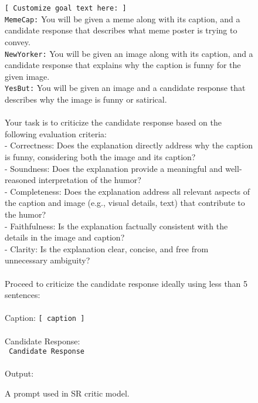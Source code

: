 \begin{figure*}
\small
\begin{tcolorbox}[
    title=Prompt for Self-Refine Critic,
    colback=white,
    colframe=Black,
    arc=0pt,        %
    outer arc=0pt,  %
]
\texttt{[ Customize goal text here: ]} \\
\texttt{MemeCap:} You will be given a meme along with its caption, and a candidate response that describes what meme poster is trying to convey. \\
\texttt{NewYorker:} You will be given an image along with its caption, and a candidate response that explains why the caption is funny for the given image. \\
\texttt{YesBut:} You will be given an image and a candidate response that describes why the image is funny or satirical. \\
\\
Your task is to criticize the candidate response based on the following evaluation criteria: \\
- Correctness: Does the explanation directly address why the caption is funny, considering both the image and its caption? \\
- Soundness: Does the explanation provide a meaningful and well-reasoned interpretation of the humor? \\
- Completeness: Does the explanation address all relevant aspects of the caption and image (e.g., visual details, text) that contribute to the humor? \\
- Faithfulness: Is the explanation factually consistent with the details in the image and caption? \\
- Clarity: Is the explanation clear, concise, and free from unnecessary ambiguity? \\
 \\
Proceed to criticize the candidate response ideally using less than 5 sentences:\\
\\
\text{[}Caption\text{]}: \texttt{[ caption ]}\\
\\
\text{[}Candidate Response\text{]}: \\
 \texttt{\text{[} Candidate Response \text{]}}\\
\\
\text{[}Output\text{]}: \\
\end{tcolorbox}
\caption{A prompt used in SR critic model.} %
\label{fig:critic-prompt}
\end{figure*}

